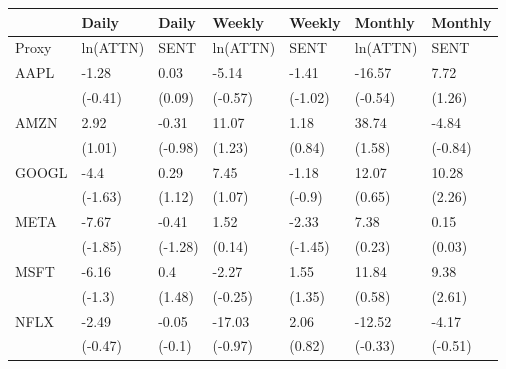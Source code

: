 \begin{tabular}{lllllll}
\toprule
{} &     Daily &    Daily &    Weekly &   Weekly &   Monthly &  Monthly \\
\midrule
Proxy &  ln(ATTN) &     SENT &  ln(ATTN) &     SENT &  ln(ATTN) &     SENT \\
AAPL  &     -1.28 &     0.03 &     -5.14 &    -1.41 &    -16.57 &     7.72 \\
      &   (-0.41) &   (0.09) &   (-0.57) &  (-1.02) &   (-0.54) &   (1.26) \\
AMZN  &      2.92 &    -0.31 &     11.07 &     1.18 &     38.74 &    -4.84 \\
      &    (1.01) &  (-0.98) &    (1.23) &   (0.84) &    (1.58) &  (-0.84) \\
GOOGL &      -4.4 &     0.29 &      7.45 &    -1.18 &     12.07 &    10.28 \\
      &   (-1.63) &   (1.12) &    (1.07) &   (-0.9) &    (0.65) &   (2.26) \\
META  &     -7.67 &    -0.41 &      1.52 &    -2.33 &      7.38 &     0.15 \\
      &   (-1.85) &  (-1.28) &    (0.14) &  (-1.45) &    (0.23) &   (0.03) \\
MSFT  &     -6.16 &      0.4 &     -2.27 &     1.55 &     11.84 &     9.38 \\
      &    (-1.3) &   (1.48) &   (-0.25) &   (1.35) &    (0.58) &   (2.61) \\
NFLX  &     -2.49 &    -0.05 &    -17.03 &     2.06 &    -12.52 &    -4.17 \\
      &   (-0.47) &   (-0.1) &   (-0.97) &   (0.82) &   (-0.33) &  (-0.51) \\
\bottomrule
\end{tabular}
